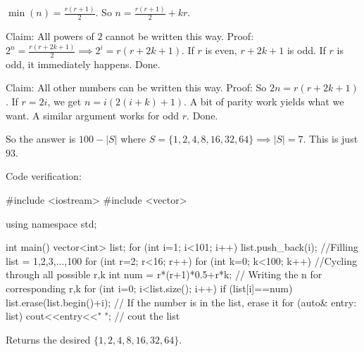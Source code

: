 $\min(n)=\frac{r(r+1)}{2}$.
So $n=\frac{r(r+1)}{2}+kr$.

Claim: All powers of $2$ cannot be written this way.
Proof: $2^n=\frac{r(r+2k+1)}{2}\implies 2^i=r(r+2k+1)$. If $r$ is even, $r+2k+1$ is odd. If $r$ is odd, it immediately happens. Done.

Claim: All other numbers can be written this way.
Proof: So $2n=r(r+2k+1)$. If $r=2i$, we get $n=i(2(i+k)+1)$. A bit of parity work yields what we want. A similar argument works for odd $r$. Done.

So the answer is $100-|S|$ where $S=\{1,2,4,8,16,32,64\}\implies |S|=7$. This is just $\boxed{93}$.

Code verification:

#include <iostream>
#include <vector>

using namespace std;

int main()
{
  vector<int> list;
  for (int i=1; i<101; i++){
    list.push_back(i); //Filling list = {1,2,3,...,100}
  }
  for (int r=2; r<16; r++){
    for (int k=0; k<100; k++){ //Cycling through all possible r,k
      int num = r*(r+1)*0.5+r*k; // Writing the n for corresponding r,k
      for (int i=0; i<list.size(); i++){
        if (list[i]==num){
          list.erase(list.begin()+i); // If the number is in the list, erase it
        }
      }
    }
  }
  for (auto& entry: list){
    cout<<entry<<" "; // cout the list
  }
}


Returns the desired $\{1,2,4,8,16,32,64\}$.
